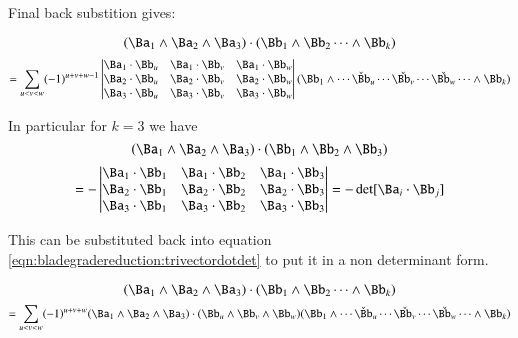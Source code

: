 Final back substition gives:

\begin{equation*}
(\Ba_1 \wedge \Ba_{2} \wedge \Ba_3) \cdot (\Bb_1 \wedge \Bb_2 \cdots \wedge \Bb_k) 
\end{equation*}
\begin{equation}\label{eqn:bladegradereduction:trivectordotdet}
=
\sum_{u<v<w} (-1)^{u+v+w-1} 
\begin{vmatrix}
\Ba_1 \cdot \Bb_u & \Ba_1 \cdot \Bb_v & \Ba_1 \cdot \Bb_w \\
\Ba_2 \cdot \Bb_u & \Ba_2 \cdot \Bb_v & \Ba_2 \cdot \Bb_w \\
\Ba_3 \cdot \Bb_u & \Ba_3 \cdot \Bb_v & \Ba_3 \cdot \Bb_w \\
\end{vmatrix} 
(\Bb_1 \wedge \cdots \check \Bb_u \cdots \check{\Bb_v} \cdots \check{\Bb_w} \cdots \wedge \Bb_k)  \\
\end{equation}

In particular for $k=3$ we have
\begin{equation*}
(\Ba_1 \wedge \Ba_{2} \wedge \Ba_3) \cdot (\Bb_1 \wedge \Bb_2 \wedge \Bb_3) 
\end{equation*}
\begin{equation}\label{eqn:bladegradereduction:trivectordotdettri}
=
-\begin{vmatrix}
\Ba_1 \cdot \Bb_1 & \Ba_1 \cdot \Bb_2 & \Ba_1 \cdot \Bb_3 \\
\Ba_2 \cdot \Bb_1 & \Ba_2 \cdot \Bb_2 & \Ba_2 \cdot \Bb_3 \\
\Ba_3 \cdot \Bb_1 & \Ba_3 \cdot \Bb_2 & \Ba_3 \cdot \Bb_3 \\
\end{vmatrix} 
=
-\det[\Ba_i \cdot \Bb_j]
\end{equation}

This can be substituted back into equation \ref{eqn:bladegradereduction:trivectordotdet} to put it in a non determinant form.

\begin{equation*}
(\Ba_1 \wedge \Ba_{2} \wedge \Ba_3) \cdot (\Bb_1 \wedge \Bb_2 \cdots \wedge \Bb_k) 
\end{equation*}
\begin{equation}\label{eqn:bladegradereduction:trivectordotnondet}
=
\sum_{u<v<w} (-1)^{u+v+w} 
(\Ba_1 \wedge \Ba_{2} \wedge \Ba_3) \cdot (\Bb_u \wedge \Bb_v \wedge \Bb_w) 
(\Bb_1 \wedge \cdots \check \Bb_u \cdots \check{\Bb_v} \cdots \check{\Bb_w} \cdots \wedge \Bb_k)  \\
\end{equation}

